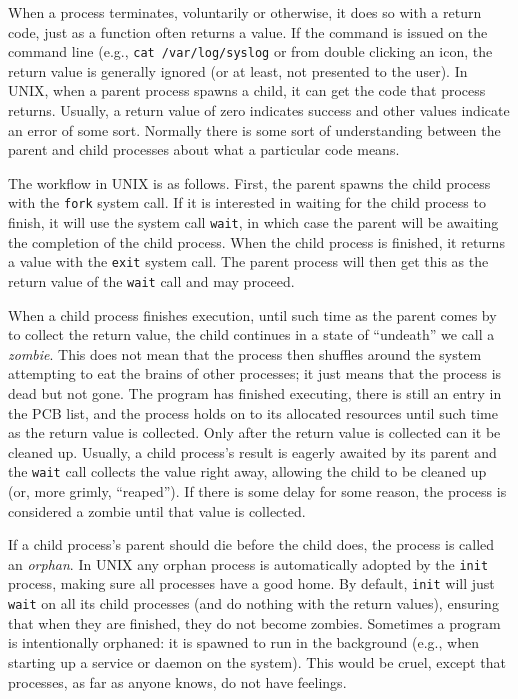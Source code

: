 When a process terminates, voluntarily or otherwise, it does so with a return code, just as a function often returns a value. If the command is issued on the command line (e.g., \texttt{cat /var/log/syslog} or from double clicking an icon, the return value is generally ignored (or at least, not presented to the user). In UNIX, when a parent process spawns a child, it can get the code that process returns. Usually, a return value of zero indicates success and other values indicate an error of some sort. Normally there is some sort of understanding between the parent and child processes about what a particular code means. 

The workflow in UNIX is as follows. First, the parent spawns the child process with the \texttt{fork} system call. If it is interested in waiting for the child process to finish, it will use the system call \texttt{wait}, in which case the parent will be awaiting the completion of the child process. When the child process is finished, it returns a value with the \texttt{exit} system call. The parent process will then get this as the return value of the \texttt{wait} call and may proceed.

When a child process finishes execution, until such time as the parent comes by to collect the return value, the child continues in a state of ``undeath'' we call a \textit{zombie}. This does not mean that the process then shuffles around the system attempting to eat the brains of other processes; it just means that the process is dead but not gone. The program has finished executing, there is still an entry in the PCB list, and the process holds on to its allocated resources until such time as the return value is collected. Only after the return value is collected can it be cleaned up. Usually, a child process's result is eagerly awaited by its parent and the \texttt{wait} call collects the value right away, allowing the child to be cleaned up (or, more grimly, ``reaped''). If there is some delay for some reason, the process is considered a zombie until that value is collected.

If a child process's parent should die before the child does, the process is called an \textit{orphan}. In UNIX any orphan process is automatically adopted by the \texttt{init} process, making sure all processes have a good home. By default, \texttt{init} will just \texttt{wait} on all its child processes (and do nothing with the return values), ensuring that when they are finished, they do not become zombies. Sometimes a program is intentionally orphaned: it is spawned to run in the background (e.g., when starting up a service or daemon on the system). This would be cruel, except that processes, as far as anyone knows, do not have feelings.



